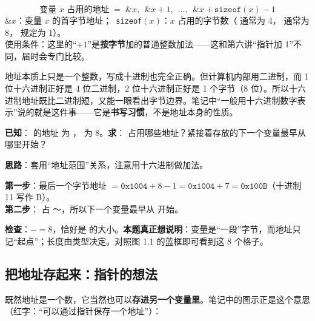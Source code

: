 \begin{formulabox}[变量占用的地址范围]
\[
\boxed{\;\text{变量 } x \text{ 占用的地址} \;=\; \&x,\ \ \&x+1,\ \ \dots,\ \ \&x+\texttt{sizeof}(x)-1\;}
\]
\small $\&x$：变量 $x$ 的首字节地址；\ \texttt{sizeof}$(x)$：$x$ 占用的字节数（ 通常为 4， 通常为 8， 规定为 1）。\\
使用条件：这里的“$+1$”是\textbf{按字节}加的普通整数加法——这和第六讲“指针加 1”不同，届时会专门比较。
\end{formulabox}

\begin{intuitionbox}[为什么地址习惯用十六进制]
地址本质上只是一个整数，写成十进制也完全正确。但计算机内部用二进制，而 1 位十六进制正好是 4 位二进制，2 位十六进制正好是 1 个字节（8 位）。所以十六进制地址既比二进制短，又能一眼看出字节边界。笔记中“一般用十六进制数字表示”说的就是这件事——它是\textbf{书写习惯}，不是地址本身的性质。
\end{intuitionbox}

\begin{examplebox}
\textbf{已知}： 的地址  为 ， 为 8。\quad\textbf{求}： 占用哪些地址？紧接着存放的下一个变量最早从哪里开始？

\textbf{思路}：套用“地址范围”关系，注意用十六进制做加法。

\textbf{第一步}：最后一个字节地址 $=\texttt{0x1004}+8-1=\texttt{0x1004}+7=\texttt{0x100B}$（十进制 11 写作 B）。\\
\textbf{第二步}： 占 ～，所以下一个变量最早从  开始。

\textbf{检查}：$-$$=8$，恰好是  的大小。\quad\textbf{本题真正想说明}：变量是“一段”字节，而地址只记“起点”；长度由类型决定。对照图 1.1 的蓝框即可看到这 8 个格子。
\end{examplebox}

\subsection{把地址存起来：指针的想法}
既然地址是一个数，它当然也可以\textbf{存进另一个变量里}。笔记中的图示正是这个意思（红字：“可以通过指针保存一个地址”）：

\begin{center}
\end{center}

